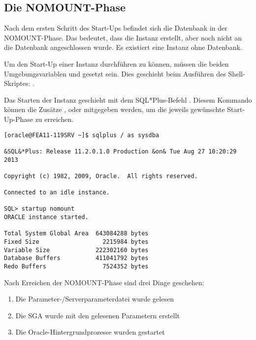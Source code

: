       \subsection{Die NOMOUNT-Phase}
        Nach dem ersten Schritt des Start-Ups befindet sich die Datenbank in der NOMOUNT-Phase. Das bedeutet, dass die Instanz erstellt, aber noch nicht an die Datenbank angeschlossen wurde. Es existiert eine Instanz ohne Datenbank.
        \begin{merke}
          Um den Start-Up einer Instanz durchf\"uhren zu k\"onnen, m\"ussen die beiden Umgebungsvariablen  und  gesetzt sein. Dies geschieht beim Ausf\"uhren des Shell-Skriptes: .
        \end{merke}
        Das Starten der Instanz geschieht mit dem SQL*Plus-Befehl . Diesem Kommando k\"onnen die Zus\"atze ,  oder  mitgegeben werden, um die jeweils gew\"unschte Start-Up-Phase zu erreichen.
        \begin{lstlisting}[caption={Einen Start-Up bis zur NOMOUNT-Phase
        durchf\"uhren},label=admin01,language=sqlplus]
[oracle@FEA11-119SRV ~]$ sqlplus / as sysdba

&SQL&*Plus: Release 11.2.0.1.0 Production &on& Tue Aug 27 10:20:29 2013

Copyright (c) 1982, 2009, Oracle.  All rights reserved.

Connected to an idle instance.

SQL> startup nomount
ORACLE instance started.

Total System Global Area  643084288 bytes
Fixed Size                  2215984 bytes
Variable Size             222302160 bytes
Database Buffers          411041792 bytes
Redo Buffers                7524352 bytes
        \end{lstlisting}


        Nach Erreichen der NOMOUNT-Phase sind drei Dinge geschehen:
        \begin{enumerate}
          \item Die Parameter-/Serverparameterdatei wurde gelesen
          \item Die SGA wurde mit den gelesenen Parametern erstellt
          \item Die Oracle-Hintergrundprozesse wurden gestartet
        \end{enumerate}
